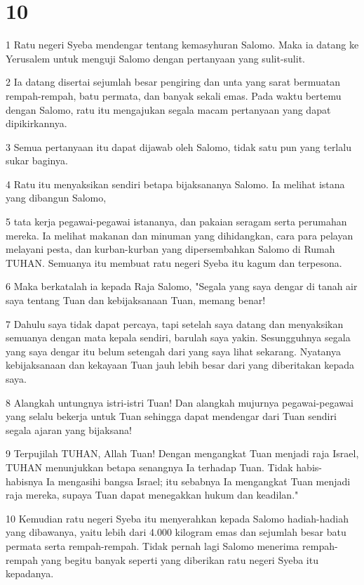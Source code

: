 \chapter{10}

\par 1 Ratu negeri Syeba mendengar tentang kemasyhuran Salomo. Maka ia datang ke Yerusalem untuk menguji Salomo dengan pertanyaan yang sulit-sulit.
\par 2 Ia datang disertai sejumlah besar pengiring dan unta yang sarat bermuatan rempah-rempah, batu permata, dan banyak sekali emas. Pada waktu bertemu dengan Salomo, ratu itu mengajukan segala macam pertanyaan yang dapat dipikirkannya.
\par 3 Semua pertanyaan itu dapat dijawab oleh Salomo, tidak satu pun yang terlalu sukar baginya.
\par 4 Ratu itu menyaksikan sendiri betapa bijaksananya Salomo. Ia melihat istana yang dibangun Salomo,
\par 5 tata kerja pegawai-pegawai istananya, dan pakaian seragam serta perumahan mereka. Ia melihat makanan dan minuman yang dihidangkan, cara para pelayan melayani pesta, dan kurban-kurban yang dipersembahkan Salomo di Rumah TUHAN. Semuanya itu membuat ratu negeri Syeba itu kagum dan terpesona.
\par 6 Maka berkatalah ia kepada Raja Salomo, "Segala yang saya dengar di tanah air saya tentang Tuan dan kebijaksanaan Tuan, memang benar!
\par 7 Dahulu saya tidak dapat percaya, tapi setelah saya datang dan menyaksikan semuanya dengan mata kepala sendiri, barulah saya yakin. Sesungguhnya segala yang saya dengar itu belum setengah dari yang saya lihat sekarang. Nyatanya kebijaksanaan dan kekayaan Tuan jauh lebih besar dari yang diberitakan kepada saya.
\par 8 Alangkah untungnya istri-istri Tuan! Dan alangkah mujurnya pegawai-pegawai yang selalu bekerja untuk Tuan sehingga dapat mendengar dari Tuan sendiri segala ajaran yang bijaksana!
\par 9 Terpujilah TUHAN, Allah Tuan! Dengan mengangkat Tuan menjadi raja Israel, TUHAN menunjukkan betapa senangnya Ia terhadap Tuan. Tidak habis-habisnya Ia mengasihi bangsa Israel; itu sebabnya Ia mengangkat Tuan menjadi raja mereka, supaya Tuan dapat menegakkan hukum dan keadilan."
\par 10 Kemudian ratu negeri Syeba itu menyerahkan kepada Salomo hadiah-hadiah yang dibawanya, yaitu lebih dari 4.000 kilogram emas dan sejumlah besar batu permata serta rempah-rempah. Tidak pernah lagi Salomo menerima rempah-rempah yang begitu banyak seperti yang diberikan ratu negeri Syeba itu kepadanya.
